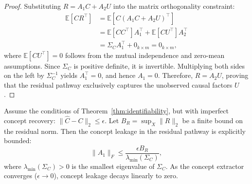 \documentclass[twoside,11pt]{article}
\begin{document}
\begin{proof}
Substituting $R = A_1 C + A_2 U$ into the matrix orthogonality constraint:
\begin{align*}
    \mathbb{E}[C R^\top] &= \mathbb{E}[C (A_1 C + A_2 U)^\top] \\
    &= \mathbb{E}[C C^\top] A_1^\top + \mathbb{E}[C U^\top] A_2^\top \\
    &= \Sigma_C A_1^\top + 0_{k \times m} = 0_{k \times m},
\end{align*}
where $\mathbb{E}[C U^\top] = 0$ follows from the mutual independence and zero-mean assumptions. Since $\Sigma_C$ is positive definite, it is invertible. Multiplying both sides on the left by $\Sigma_C^{-1}$ yields $A_1^\top = 0$, and hence $A_1 = 0$. Therefore, $R = A_2 U$, proving that the residual pathway exclusively captures the unobserved causal factors $U$.
\end{proof}

\begin{theorem}
\label{thm:identifiability_imperfect}
Assume the conditions of Theorem~\ref{thm:identifiability}, but with imperfect concept recovery: $\|\hat{C} - C\|_2 \leq \epsilon$. Let $B_R = \sup_X \|R\|_2$ be a finite bound on the residual norm. Then the concept leakage in the residual pathway is explicitly bounded:
\begin{equation}
    \|A_1\|_F \leq \frac{\epsilon B_R}{\lambda_{\min}(\Sigma_C)},
\end{equation}
where $\lambda_{\min}(\Sigma_C) > 0$ is the smallest eigenvalue of $\Sigma_C$. As the concept extractor converges ($\epsilon \to 0$), concept leakage decays linearly to zero.
\end{theorem}
\end{document}
